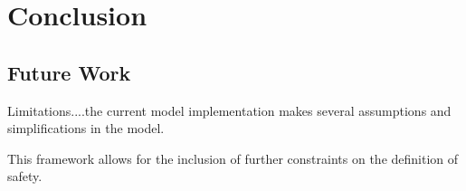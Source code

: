 \section{Conclusion}
\subsection{Future Work}
Limitations....the current model implementation makes several assumptions and simplifications in the model. 

This framework allows for the inclusion of further constraints on the definition of safety.